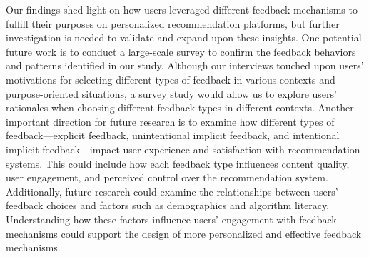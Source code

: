 Our findings shed light on how users leveraged different feedback mechanisms to fulfill their purposes on personalized recommendation platforms, but further investigation is needed to validate and expand upon these insights. One potential future work is to conduct a large-scale survey to confirm the feedback behaviors and patterns identified in our study. Although our interviews touched upon users' motivations for selecting different types of feedback in various contexts and purpose-oriented situations, a survey study would allow us to explore users' rationales when choosing different feedback types in different contexts. Another important direction for future research is to examine how different types of feedback—explicit feedback, unintentional implicit feedback, and intentional implicit feedback—impact user experience and satisfaction with recommendation systems. This could include how each feedback type influences content quality, user engagement, and perceived control over the recommendation system. Additionally, future research could examine the relationships between users' feedback choices and factors such as demographics and algorithm literacy. Understanding how these factors influence users' engagement with feedback mechanisms could support the design of more personalized and effective feedback mechanisms.